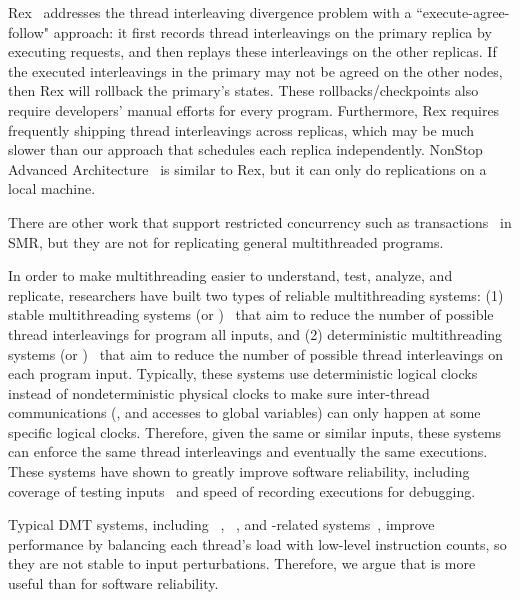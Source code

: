 Rex~\cite{rex:eurosys14} addresses the thread interleaving divergence problem
with a ``execute-agree-follow" approach: it first records thread interleavings
on the primary replica by executing requests, and then replays these
interleavings on the other replicas. If the executed interleavings in the
primary may not be agreed on the other nodes, then Rex will rollback the
primary's states. These rollbacks/checkpoints also require developers' manual
efforts for every program. Furthermore, Rex requires frequently shipping thread
interleavings across replicas, which may be much slower than our \smt approach
that schedules each replica independently. NonStop Advanced
Architecture~\cite{nonstop:dsn05} is similar to Rex, but it can only do
replications on a local machine.

There are other work that support restricted concurrency such as
transactions~\cite{vandiver:sosp07, kobus:icdcs13} in SMR, but they are not for
replicating general multithreaded programs.

  In order to make multithreading easier to
understand, test, analyze, and replicate, researchers have built two types of
reliable multithreading systems: (1) stable multithreading systems (or
\smt)~\cite{grace:oopsla09, dthreads:sosp11, determinator:osdi10} that aim to
reduce the number of possible thread interleavings for program all inputs, and
(2) deterministic multithreading systems (or \dmt)~\cite{dpj:oopsla09,
dmp:asplos09, kendo:asplos09, coredet:asplos10, dos:osdi10, ddos:asplos13,
ics:oopsla13} that aim to reduce the number of possible thread interleavings on
each program input. Typically, these systems use deterministic logical clocks
instead of nondeterministic physical clocks to make sure inter-thread
communications (\eg, \mutexlock and accesses to global variables) can only
happen at some specific logical clocks. Therefore, given the same or similar
inputs, these systems can enforce the same thread interleavings and eventually
the same executions. These systems 
have shown to greatly improve software reliability, including coverage of
testing inputs~\cite{ics:oopsla13} and speed of recording
executions\cite{dos:osdi10} for debugging.

Typical DMT systems, including \kendo~\cite{kendo:asplos09},
\coredet~\cite{coredet:asplos10}, and \coredet-related systems~\cite{dos:osdi10,
ddos:asplos13}, improve performance by balancing each thread's load with
low-level instruction counts, so they are not stable to input perturbations.
Therefore, we argue that \smt is more useful than \dmt for software reliability.

